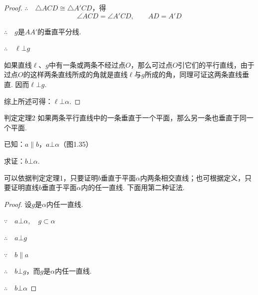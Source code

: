 \begin{proof}
$\therefore\quad \triangle ACD\cong \triangle A'CD$，得
\[\angle ACD= \angle A'CD,\qquad AD=A'D\]

$\therefore\quad g$是$AA'$的垂直平分线.

$\therefore \quad \ell\bot g$

如果直线$\ell$、$g$中有一条或两条不经过点$O$，那么可过点$O$引它们的平行直线，由于过点$O$的这样两条直线所成的角就是直线$\ell$与$g$所成的角，同理可证这两条直线垂直. 因而$\ell\bot g$.

综上所述可得：$\ell\bot \alpha$.
\end{proof}

\begin{thm}
 {判定定理2} 如果两条平行直线中的一条垂直于一个平面，那么另一条也垂直于同一个平面.   
\end{thm}

已知：$a\parallel b$，$a\bot\alpha$（图1.35）

求证：$b\bot \alpha$.

\begin{analyze}
可以依据判定定理1，只要证明$b$垂直于平面$\alpha$内两条相交直线；也可根据定义，只要证明直线$b$垂直于平面$\alpha$内的任一直线. 下面用第二种证法.
\end{analyze}

\begin{proof}
设$g$是$\alpha$内任一直线.

\noindent
\begin{minipage}{.55\textwidth}
\CTEXindent
    $\because\quad a\bot \alpha,\quad g\subset \alpha$

    $\therefore\quad a\bot g$
    
    $\because\quad b\parallel a$
    
    $\therefore\quad b\bot g$，而$g$是$\alpha$内任一直线.
    
    $\therefore\quad b\bot\alpha$
\end{minipage}
\hfill
\begin{minipage}{.43\textwidth}
\centering
{}
\end{minipage}
\end{proof}





